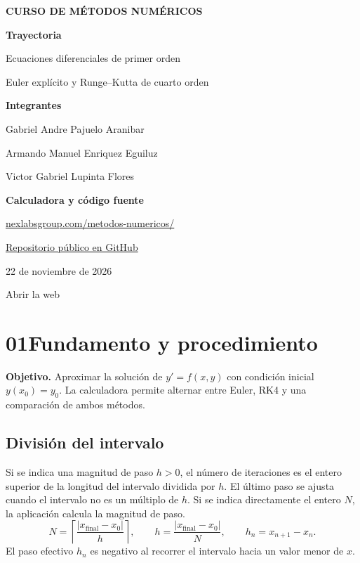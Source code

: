 \documentclass[11pt,a4paper]{article}
\newcommand{\topic}[2]{\section*{\sffamily\color{Navy}#1\enspace #2}\vspace{-.35em}}
\newcommand{\subtopic}[1]{\subsection*{\sffamily\color{Blue}#1}}
\begin{document}
\hypersetup{pageanchor=false}
\begin{titlepage}
\sffamily
{\color{Blue}\bfseries CURSO DE MÉTODOS NUMÉRICOS}\par
\vspace{3.05cm}
{\fontsize{58}{62}\selectfont\bfseries\color{Navy} Trayectoria\par}
\vspace{.45cm}
{\Large\color{Navy} Ecuaciones diferenciales de primer orden\par}
{\large\color{Slate} Euler explícito y Runge--Kutta de cuarto orden\par}
\vspace{2cm}
{\bfseries\color{Blue} Integrantes}\par
Gabriel Andre Pajuelo Aranibar\par
Armando Manuel Enriquez Eguiluz\par
Victor Gabriel Lupinta Flores\par
\vfill
\noindent\begin{minipage}[c]{.69\linewidth}
{\large\bfseries\color{Navy} Calculadora y código fuente}\par
\href{https://nexlabsgroup.com/metodos-numericos/}{nexlabsgroup.com/metodos-numericos/}\par
\href{https://github.com/Quetzalq4321q/metodos-numericos}{Repositorio público en GitHub}\par
{\small\color{Slate}22 de noviembre de 2026}
\end{minipage}\hfill
\begin{minipage}[c]{.22\linewidth}\centering
\href{https://nexlabsgroup.com/metodos-numericos/}{\color{black}}\par
\small Abrir la web
\end{minipage}
\end{titlepage}
\hypersetup{pageanchor=true}

\topic{01}{Fundamento y procedimiento}
\textbf{Objetivo.} Aproximar la solución de $y'=f(x,y)$ con condición inicial $y(x_0)=y_0$. La calculadora permite alternar entre Euler, RK4 y una comparación de ambos métodos.

\subtopic{División del intervalo}
Si se indica una magnitud de paso $h>0$, el número de iteraciones es el entero superior de la longitud del intervalo dividida por $h$. El último paso se ajusta cuando el intervalo no es un múltiplo de $h$. Si se indica directamente el entero $N$, la aplicación calcula la magnitud de paso.
\[
 N=\left\lceil\frac{|x_{\mathrm{final}}-x_0|}{h}\right\rceil,
 \qquad h=\frac{|x_{\mathrm{final}}-x_0|}{N},
 \qquad h_n=x_{n+1}-x_n.
\]
El paso efectivo $h_n$ es negativo al recorrer el intervalo hacia un valor menor de $x$.
\end{document}
